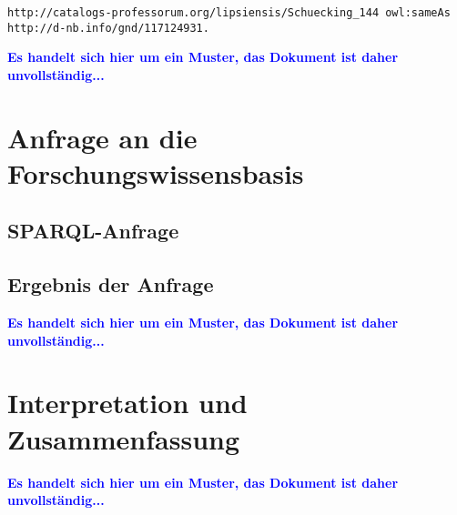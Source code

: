 \documentclass[a4paper,10pt,parskip]{article}
\begin{document}
\begin{lstlisting}[caption={Beispiel für die Verwendung von owl:sameAS}, label={list:sameAs}]
http://catalogs-professorum.org/lipsiensis/Schuecking_144 owl:sameAs http://d-nb.info/gnd/117124931.
\end{lstlisting}


\vspace{0.5cm}\textcolor{blue}{\textbf{Es handelt sich hier um ein Muster, das Dokument ist daher unvollständig...}}

\section{Anfrage an die Forschungswissensbasis}

\subsection{SPARQL-Anfrage}

\subsection{Ergebnis der Anfrage}


\vspace{0.5cm}\textcolor{blue}{\textbf{Es handelt sich hier um ein Muster, das Dokument ist daher unvollständig...}}


\section{Interpretation und Zusammenfassung}

\vspace{0.5cm}\textcolor{blue}{\textbf{Es handelt sich hier um ein Muster, das Dokument ist daher unvollständig...}}



\end{document}
